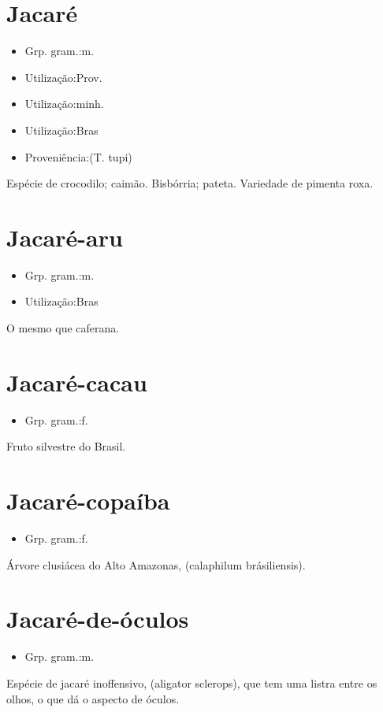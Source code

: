 \documentclass{article}
\begin{document}
\section{Jacaré}
\begin{itemize}
\item {Grp. gram.:m.}
\end{itemize}
\begin{itemize}
\item {Utilização:Prov.}
\end{itemize}
\begin{itemize}
\item {Utilização:minh.}
\end{itemize}
\begin{itemize}
\item {Utilização:Bras}
\end{itemize}
\begin{itemize}
\item {Proveniência:(T. tupi)}
\end{itemize}
Espécie de crocodilo; caimão.
Bisbórria; pateta.
Variedade de pimenta roxa.
\section{Jacaré-aru}
\begin{itemize}
\item {Grp. gram.:m.}
\end{itemize}
\begin{itemize}
\item {Utilização:Bras}
\end{itemize}
O mesmo que \textunderscore caferana\textunderscore .
\section{Jacaré-cacau}
\begin{itemize}
\item {Grp. gram.:f.}
\end{itemize}
Fruto silvestre do Brasil.
\section{Jacaré-copaíba}
\begin{itemize}
\item {Grp. gram.:f.}
\end{itemize}
Árvore clusiácea do Alto Amazonas, (\textunderscore calaphilum brásiliensis\textunderscore ).
\section{Jacaré-de-óculos}
\begin{itemize}
\item {Grp. gram.:m.}
\end{itemize}
Espécie de jacaré inoffensivo, (\textunderscore aligator sclerops\textunderscore ), que tem uma listra entre os olhos, o que dá o aspecto de óculos.
\end{document}

